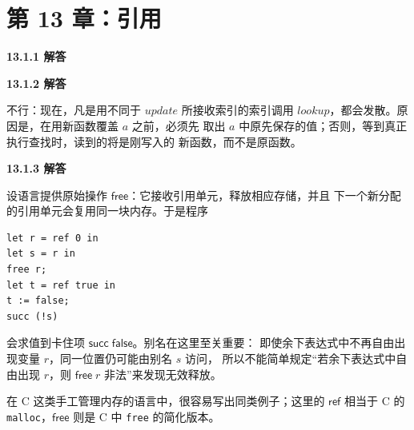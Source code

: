 \section{第 13 章：引用}

\begin{taplauthorsolutionentrybox}
\label{sol:author:13.1.1}
\textbf{13.1.1 解答}

\begin{center}
\end{center}

\end{taplauthorsolutionentrybox}

\begin{taplauthorsolutionentrybox}
\label{sol:author:13.1.2}
\textbf{13.1.2 解答}

不行：现在，凡是用不同于 \(\mathit{update}\) 所接收索引的索引调用
\(\mathit{lookup}\)，都会发散。原因是，在用新函数覆盖 \(a\) 之前，必须先
取出 \(a\) 中原先保存的值；否则，等到真正执行查找时，读到的将是刚写入的
新函数，而不是原函数。

\end{taplauthorsolutionentrybox}

\begin{taplauthorsolutionentrybox}
\label{sol:author:13.1.3}
\textbf{13.1.3 解答}

设语言提供原始操作 \(\mathsf{free}\)：它接收引用单元，释放相应存储，并且
下一个新分配的引用单元会复用同一块内存。于是程序
\begin{lstlisting}
let r = ref 0 in
let s = r in
free r;
let t = ref true in
t := false;
succ (!s)
\end{lstlisting}
会求值到卡住项 \(\mathsf{succ}\;\mathsf{false}\)。别名在这里至关重要：
即使余下表达式中不再自由出现变量 \(r\)，同一位置仍可能由别名 \(s\) 访问，
所以不能简单规定“若余下表达式中自由出现 \(r\)，则 \(\mathsf{free}\;r\)
非法”来发现无效释放。

在 C 这类手工管理内存的语言中，很容易写出同类例子；这里的
\(\mathsf{ref}\) 相当于 C 的 \texttt{malloc}，\(\mathsf{free}\) 则是 C 中
\texttt{free} 的简化版本。

\end{taplauthorsolutionentrybox}

